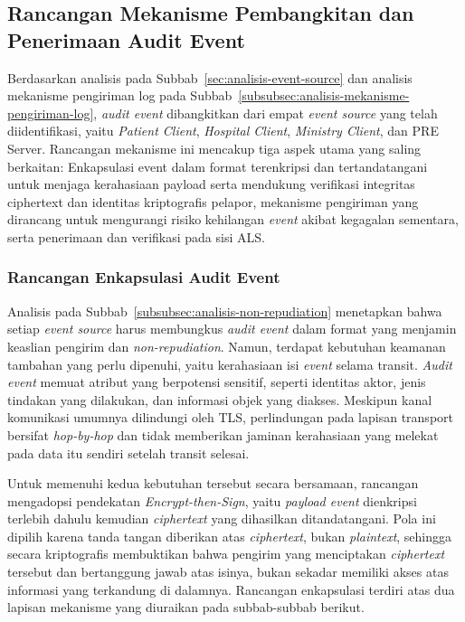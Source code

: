 %

\subsection{Rancangan Mekanisme Pembangkitan dan Penerimaan Audit Event}
\label{subsec:rancangan-pembangkitan-event}

Berdasarkan analisis pada Subbab~\ref{sec:analisis-event-source} dan analisis mekanisme pengiriman log pada Subbab~\ref{subsubsec:analisis-mekanisme-pengiriman-log}, \textit{audit event} dibangkitkan dari empat \textit{event source} yang telah diidentifikasi, yaitu \textit{Patient Client}, \textit{Hospital Client}, \textit{Ministry Client}, dan PRE Server. Rancangan mekanisme ini mencakup tiga aspek utama yang saling berkaitan:
Enkapsulasi event dalam format terenkripsi dan tertandatangani untuk menjaga kerahasiaan payload serta mendukung verifikasi integritas ciphertext dan identitas kriptografis pelapor, mekanisme pengiriman yang
dirancang untuk mengurangi risiko kehilangan \textit{event} akibat kegagalan
sementara, serta penerimaan dan verifikasi pada sisi ALS.

\subsubsection{Rancangan Enkapsulasi Audit Event}
\label{subsubsec:rancangan-enkapsulasi-event}

Analisis pada Subbab~\ref{subsubsec:analisis-non-repudiation} menetapkan bahwa setiap \textit{event source} harus membungkus \textit{audit event} dalam format yang menjamin keaslian pengirim dan \textit{non-repudiation}. Namun, terdapat kebutuhan keamanan tambahan yang perlu dipenuhi, yaitu kerahasiaan isi \textit{event} selama transit. \textit{Audit event} memuat atribut yang berpotensi sensitif, seperti identitas aktor, jenis tindakan yang dilakukan, dan informasi objek yang diakses. Meskipun kanal komunikasi umumnya dilindungi oleh TLS, perlindungan pada lapisan transport bersifat \textit{hop-by-hop} dan tidak memberikan jaminan kerahasiaan yang melekat pada data itu sendiri setelah transit selesai.

Untuk memenuhi kedua kebutuhan tersebut secara bersamaan, rancangan mengadopsi pendekatan \textit{Encrypt-then-Sign}, yaitu \textit{payload event} dienkripsi terlebih dahulu kemudian \textit{ciphertext} yang dihasilkan ditandatangani. Pola ini dipilih karena tanda tangan diberikan atas \textit{ciphertext}, bukan \textit{plaintext}, sehingga secara kriptografis membuktikan bahwa pengirim yang menciptakan \textit{ciphertext} tersebut dan bertanggung jawab atas isinya, bukan sekadar memiliki akses atas informasi yang terkandung di dalamnya. Rancangan enkapsulasi terdiri atas dua lapisan mekanisme yang diuraikan pada subbab-subbab berikut.

